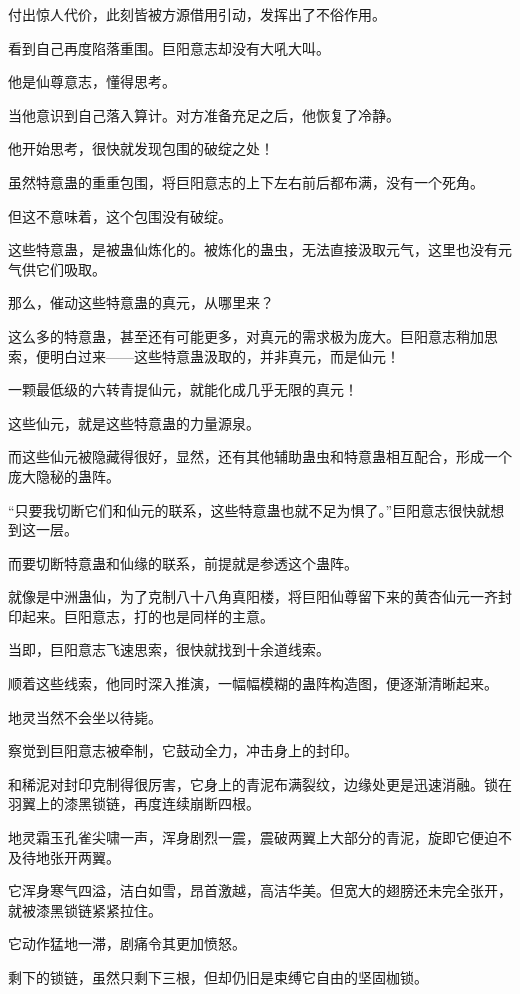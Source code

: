 \begin{this_body}
付出惊人代价，此刻皆被方源借用引动，发挥出了不俗作用。

看到自己再度陷落重围。巨阳意志却没有大吼大叫。

他是仙尊意志，懂得思考。

当他意识到自己落入算计。对方准备充足之后，他恢复了冷静。

他开始思考，很快就发现包围的破绽之处！

虽然特意蛊的重重包围，将巨阳意志的上下左右前后都布满，没有一个死角。

但这不意味着，这个包围没有破绽。

这些特意蛊，是被蛊仙炼化的。被炼化的蛊虫，无法直接汲取元气，这里也没有元气供它们吸取。

那么，催动这些特意蛊的真元，从哪里来？

这么多的特意蛊，甚至还有可能更多，对真元的需求极为庞大。巨阳意志稍加思索，便明白过来——这些特意蛊汲取的，并非真元，而是仙元！

一颗最低级的六转青提仙元，就能化成几乎无限的真元！

这些仙元，就是这些特意蛊的力量源泉。

而这些仙元被隐藏得很好，显然，还有其他辅助蛊虫和特意蛊相互配合，形成一个庞大隐秘的蛊阵。

“只要我切断它们和仙元的联系，这些特意蛊也就不足为惧了。”巨阳意志很快就想到这一层。

而要切断特意蛊和仙缘的联系，前提就是参透这个蛊阵。

就像是中洲蛊仙，为了克制八十八角真阳楼，将巨阳仙尊留下来的黄杏仙元一齐封印起来。巨阳意志，打的也是同样的主意。

当即，巨阳意志飞速思索，很快就找到十余道线索。

顺着这些线索，他同时深入推演，一幅幅模糊的蛊阵构造图，便逐渐清晰起来。

地灵当然不会坐以待毙。

察觉到巨阳意志被牵制，它鼓动全力，冲击身上的封印。

和稀泥对封印克制得很厉害，它身上的青泥布满裂纹，边缘处更是迅速消融。锁在羽翼上的漆黑锁链，再度连续崩断四根。

地灵霜玉孔雀尖啸一声，浑身剧烈一震，震破两翼上大部分的青泥，旋即它便迫不及待地张开两翼。

它浑身寒气四溢，洁白如雪，昂首激越，高洁华美。但宽大的翅膀还未完全张开，就被漆黑锁链紧紧拉住。

它动作猛地一滞，剧痛令其更加愤怒。

剩下的锁链，虽然只剩下三根，但却仍旧是束缚它自由的坚固枷锁。


\end{this_body}
